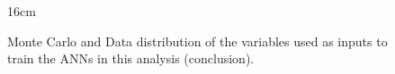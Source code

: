 \begin{figure}[hbtp]{16cm}
	\setcounter{figure}{30}
	\ContinuedFloat
	\caption{Monte Carlo and Data distribution of the variables used as inputs to train the ANNs in this analysis (conclusion).}
	\centering
\end{figure}
